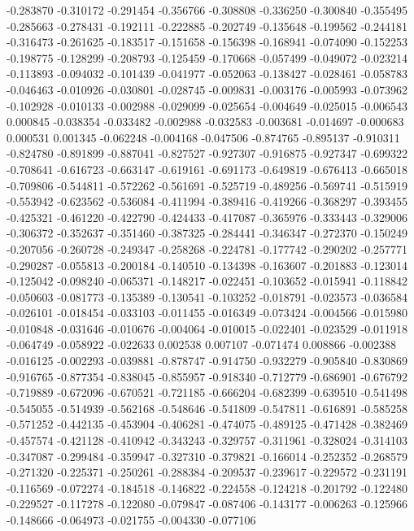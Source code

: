 -0.283870
-0.310172
-0.291454
-0.356766
-0.308808
-0.336250
-0.300840
-0.355495
-0.285663
-0.278431
-0.192111
-0.222885
-0.202749
-0.135648
-0.199562
-0.244181
-0.316473
-0.261625
-0.183517
-0.151658
-0.156398
-0.168941
-0.074090
-0.152253
-0.198775
-0.128299
-0.208793
-0.125459
-0.170668
-0.057499
-0.049072
-0.023214
-0.113893
-0.094032
-0.101439
-0.041977
-0.052063
-0.138427
-0.028461
-0.058783
-0.046463
-0.010926
-0.030801
-0.028745
-0.009831
-0.003176
-0.005993
-0.073962
-0.102928
-0.010133
-0.002988
-0.029099
-0.025654
-0.004649
-0.025015
-0.006543
0.000845
-0.038354
-0.033482
-0.002988
-0.032583
-0.003681
-0.014697
-0.000683
0.000531
0.001345
-0.062248
-0.004168
-0.047506
-0.874765
-0.895137
-0.910311
-0.824780
-0.891899
-0.887041
-0.827527
-0.927307
-0.916875
-0.927347
-0.699322
-0.708641
-0.616723
-0.663147
-0.619161
-0.691173
-0.649819
-0.676413
-0.665018
-0.709806
-0.544811
-0.572262
-0.561691
-0.525719
-0.489256
-0.569741
-0.515919
-0.553942
-0.623562
-0.536084
-0.411994
-0.389416
-0.419266
-0.368297
-0.393455
-0.425321
-0.461220
-0.422790
-0.424433
-0.417087
-0.365976
-0.333443
-0.329006
-0.306372
-0.352637
-0.351460
-0.387325
-0.284441
-0.346347
-0.272370
-0.150249
-0.207056
-0.260728
-0.249347
-0.258268
-0.224781
-0.177742
-0.290202
-0.257771
-0.290287
-0.055813
-0.200184
-0.140510
-0.134398
-0.163607
-0.201883
-0.123014
-0.125042
-0.098240
-0.065371
-0.148217
-0.022451
-0.103652
-0.015941
-0.118842
-0.050603
-0.081773
-0.135389
-0.130541
-0.103252
-0.018791
-0.023573
-0.036584
-0.026101
-0.018454
-0.033103
-0.011455
-0.016349
-0.073424
-0.004566
-0.015980
-0.010848
-0.031646
-0.010676
-0.004064
-0.010015
-0.022401
-0.023529
-0.011918
-0.064749
-0.058922
-0.022633
0.002538
0.007107
-0.071474
0.008866
-0.002388
-0.016125
-0.002293
-0.039881
-0.878747
-0.914750
-0.932279
-0.905840
-0.830869
-0.916765
-0.877354
-0.838045
-0.855957
-0.918340
-0.712779
-0.686901
-0.676792
-0.719889
-0.672096
-0.670521
-0.721185
-0.666204
-0.682399
-0.639510
-0.541498
-0.545055
-0.514939
-0.562168
-0.548646
-0.541809
-0.547811
-0.616891
-0.585258
-0.571252
-0.442135
-0.453904
-0.406281
-0.474075
-0.489125
-0.471428
-0.382469
-0.457574
-0.421128
-0.410942
-0.343243
-0.329757
-0.311961
-0.328024
-0.314103
-0.347087
-0.299484
-0.359947
-0.327310
-0.379821
-0.166014
-0.252352
-0.268579
-0.271320
-0.225371
-0.250261
-0.288384
-0.209537
-0.239617
-0.229572
-0.231191
-0.116569
-0.072274
-0.184518
-0.146822
-0.224558
-0.124218
-0.201792
-0.122480
-0.229527
-0.117278
-0.122080
-0.079847
-0.087406
-0.143177
-0.006263
-0.125966
-0.148666
-0.064973
-0.021755
-0.004330
-0.077106
